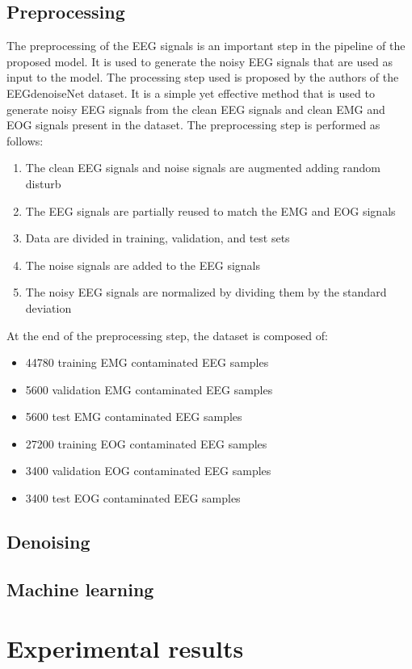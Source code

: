 \documentclass[a4paper]{sapthesis}
\begin{document}
\section{Preprocessing}
The preprocessing of the EEG signals is an important step in the
pipeline of the proposed model. It is used to generate the noisy EEG
signals that are used as input to the model.
The processing step used is proposed by the authors of the EEGdenoiseNet
dataset\cite{EEGdenoiseNet}. It is a simple yet effective method that
is used to generate noisy EEG signals from the clean EEG signals and clean 
EMG and EOG signals present in the dataset.
The preprocessing step is performed as follows:
\begin{enumerate}
\item The clean EEG signals and noise signals are augmented adding 
random disturb
\item The EEG signals are partially reused to match the EMG and EOG
signals
\item Data are divided in training, validation, and test sets
\item The noise signals are added to the EEG signals
\item The noisy EEG signals are normalized by dividing them by the
standard deviation
\end{enumerate}
At the end of the preprocessing step, the dataset is composed of:
\begin{itemize}
\item 44780 training EMG contaminated EEG samples
\item 5600 validation EMG contaminated EEG samples
\item 5600 test EMG contaminated EEG samples
\item 27200 training EOG contaminated EEG samples
\item 3400 validation EOG contaminated EEG samples
\item 3400 test EOG contaminated EEG samples
\end{itemize}
\section{Denoising}
\section{Machine learning}
\chapter{Experimental results}
\end{document}
